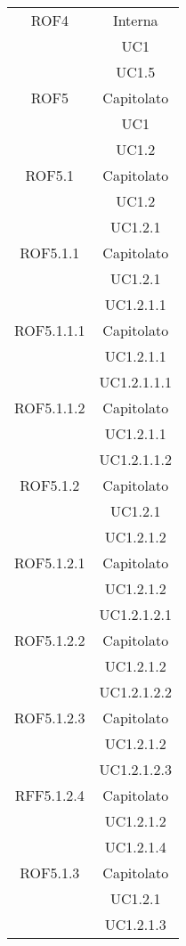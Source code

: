 \begin{longtable}{|c|c|}
\midrule
ROF4
& Interna\\
& UC1\\
& UC1.5\\

\midrule
ROF5
& Capitolato\\
& UC1\\
& UC1.2\\

\midrule
ROF5.1
& Capitolato\\
& UC1.2\\
& UC1.2.1\\

\midrule
ROF5.1.1
& Capitolato\\
& UC1.2.1\\
& UC1.2.1.1\\

\midrule
ROF5.1.1.1
& Capitolato\\
& UC1.2.1.1\\
& UC1.2.1.1.1\\

\midrule
ROF5.1.1.2
& Capitolato\\
& UC1.2.1.1\\
& UC1.2.1.1.2\\

\midrule
ROF5.1.2
& Capitolato\\
& UC1.2.1\\
& UC1.2.1.2\\

\midrule
ROF5.1.2.1
& Capitolato\\
& UC1.2.1.2\\
& UC1.2.1.2.1\\

\midrule
ROF5.1.2.2
& Capitolato\\
& UC1.2.1.2\\
& UC1.2.1.2.2\\

\midrule
ROF5.1.2.3
& Capitolato\\
& UC1.2.1.2\\
& UC1.2.1.2.3\\

\midrule
RFF5.1.2.4
& Capitolato\\
& UC1.2.1.2\\
& UC1.2.1.4\\

\midrule
ROF5.1.3
& Capitolato\\
& UC1.2.1\\
& UC1.2.1.3\\


\end{longtable}
